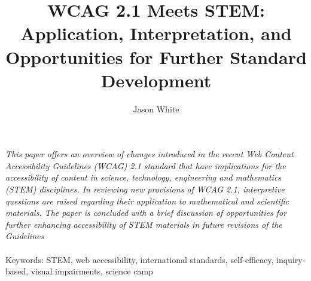 \documentclass[11.5pt]{sig-alternate} %
\makeatletter
\let\oldabstract\abstract
\let\oldendabstract\endabstract
\renewenvironment{abstract} %
{\renewenvironment{quotation}%
               {\list{}{\addtolength{\leftmargin}{1em} %
                        \listparindent 1.5em%
                        \itemindent    \listparindent%
                        \rightmargin   \leftmargin%
                        \parsep        \z@ \@plus\p@}%
                \item\relax}%
               {\endlist}%
\oldabstract}
{\oldendabstract}
\makeatother
\begin{document}
\title{WCAG 2.1 Meets STEM: Application, Interpretation, and Opportunities for Further Standard Development}

\author[1]{\large \color{blue}Jason White}


\toappear{}
\maketitle
\begin{@twocolumnfalse} 
\begin{abstract}
\item 
\textit {This paper offers an overview of changes introduced in the recent \textit{Web Content Accessibility Guidelines (WCAG) 2.1} standard that have implications for the accessibility of content in science, technology, engineering and mathematics (STEM) disciplines. In reviewing new provisions of WCAG 2.1, interpretive questions are raised regarding their application to mathematical and scientific materials. The paper is concluded with a brief discussion of opportunities for further enhancing accessibility of STEM materials in future revisions of the Guidelines}
\\ \\
Keywords: STEM, web accessibility, international standards, self-efficacy, inquiry-based, visual impairments, science camp
\end{abstract}
\end{@twocolumnfalse}

\end{document}
